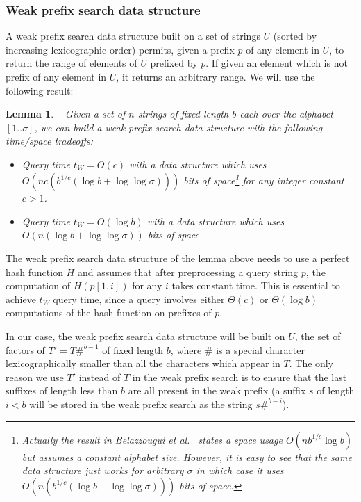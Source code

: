 \documentclass{article}
\newcommand{\?}{\mskip1.5mu}
\newtheorem{lemma}{Lemma}
\begin{document}
\subsubsection{Weak prefix search data structure}
A weak prefix search data structure built on a set of strings $U$ (sorted by increasing lexicographic order) permits, given a prefix $p$ of any element in $U$, to return the range of elements of $U$ prefixed by $p$. If given an element which is not prefix of any element in $U$, it returns an arbitrary range. We will use the following result:
\begin{lemma}~\cite{BBPV10}
\label{lemma:weak_pref_search}
Given a set of $n$ strings of fixed length $b$ each over the alphabet $[1..\sigma]$, we can build a weak prefix search data structure with the following time/space tradeoffs:
\begin{itemize}
\item Query time $t_W=O(c)$ with a data structure which uses $O(nc(b^{1/c}(\log b+\log\log\sigma)))$ bits of space\footnote{Actually the result in Belazzougui et al.~\cite{BBPV10} states a space usage $O(nb^{1/c}\log b)$ but assumes a constant alphabet size. However, it is easy to see that the same data structure just works for arbitrary $\sigma$ in which case it uses $O(n(b^{1/c}(\log b+\log\log\sigma)))$ bits of space.} for any integer constant $c>1$. 
\item Query time $t_W=O(\log b)$ with a data structure which uses $O(n(\log b+\log\log\sigma))$ bits of space. 
\end{itemize}
\end{lemma}
The weak prefix search data structure of the lemma above needs to use a perfect hash function $H$ and assumes that after preprocessing a query string $p$, the computation of $H(p[1,i])$ for any $i$ takes constant time. This is essential to achieve $t_W$ query time, since a query involves either $\Theta(c)$ or $\Theta(\log b)$ computations of the hash function on prefixes of $p$. 


In our case, the weak prefix search data structure will be built on $U$, the set of factors of $T'=T\#^{b-1}$ of fixed length $b$, where $\#$ is a special character lexicographically smaller than all the characters which appear in $T$. The only reason we use $T'$ instead of $T$ in the weak prefix search is to ensure that the last suffixes of length less than $b$ are all present in the weak prefix (a suffix $s$ of length $i<b$ will be stored in the weak prefix search as the string $s\#^{b-i}$).
\end{document}
